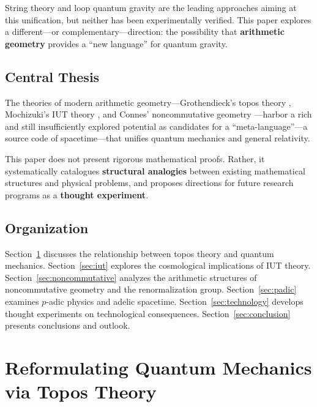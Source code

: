 \documentclass[12pt,a4paper]{article}
\theoremstyle{definition}
\begin{document}
String theory \cite{Polchinski1998} and loop quantum gravity \cite{Rovelli2004} are the leading approaches aiming at this unification, but neither has been experimentally verified. This paper explores a different---or complementary---direction: the possibility that \textbf{arithmetic geometry} provides a ``new language'' for quantum gravity.

\subsection{Central Thesis}

\begin{keyinsight}
The theories of modern arithmetic geometry---Grothendieck's topos theory \cite{SGA4}, Mochizuki's IUT theory \cite{Mochizuki2012a}, and Connes' noncommutative geometry \cite{Connes1994}---harbor a rich and still insufficiently explored potential as candidates for a ``meta-language''---a source code of spacetime---that unifies quantum mechanics and general relativity.
\end{keyinsight}

This paper does not present rigorous mathematical proofs. Rather, it systematically catalogues \textbf{structural analogies} between existing mathematical structures and physical problems, and proposes directions for future research programs as a \textbf{thought experiment}.

\subsection{Organization}

Section~\ref{sec:topos} discusses the relationship between topos theory and quantum mechanics. Section~\ref{sec:iut} explores the cosmological implications of IUT theory. Section~\ref{sec:noncommutative} analyzes the arithmetic structures of noncommutative geometry and the renormalization group. Section~\ref{sec:padic} examines $p$-adic physics and adelic spacetime. Section~\ref{sec:technology} develops thought experiments on technological consequences. Section~\ref{sec:conclusion} presents conclusions and outlook.


\newpage
\section{Reformulating Quantum Mechanics via Topos Theory}
\label{sec:topos}
\end{document}
